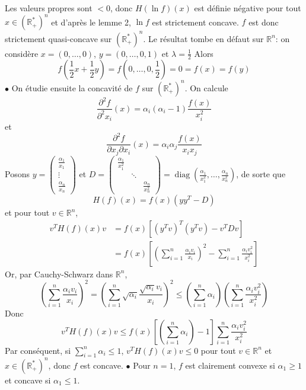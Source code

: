 \documentclass{report}
\DeclareMathOperator{\diag}{diag}
\begin{document}
Les valeurs propres sont $<0$, donc $H(\ln f)(x)$ est définie négative pour tout $x\in(\mathbb R_+^*)^n $ et d'après le lemme 2, $\ln f$ est strictement concave. $f$ est donc strictement quasi-concave sur $(\mathbb R_+^*)^n$.\newline
Le résultat tombe en défaut sur $\mathbb R^n$: on considère $x=(0,\ldots,0)$, $y=(0,\ldots,0,1)$ et $\lambda=\frac{1}{2}$ Alors $$f(\frac{1}{2}x + \frac{1}{2}y) = f(0,\ldots, 0,\frac{1}{2})=0 = f(x) = f(y)$$
$\bullet$ On étudie ensuite la concavité de $f$ sur $(\mathbb R_+^*)^n$.\newline
On calcule $$\frac{\partial^2 f}{\partial^2 x_i}(x) = \alpha_i(\alpha_i-1)\frac{f(x)}{x_i^2}$$
et $$\frac{\partial^2 f}{\partial x_j \partial x_i}(x) = \alpha_i \alpha_j\frac{f(x)}{x_i x_j}$$
Posons $y=\begin{pmatrix}
\frac{\alpha_1}{x_1}\\
\vdots\\
\frac{\alpha_n}{x_n}
\end{pmatrix}$ et $D=\begin{pmatrix}
\frac{\alpha_1}{x_1^2}\\
& \ddots \\
&& \frac{\alpha_n}{x_n^2}
\end{pmatrix}=\diag(\frac{\alpha_1}{x_1^2},\ldots,\frac{\alpha_n}{x_n^2})$, de sorte que 
$$H(f)(x)=f(x)(yy^T-D)$$ et pour tout $v\in \mathbb R^n$,
$$\begin{aligned} v^TH(f)(x)v &= f(x)[(y^Tv)^T(y^Tv)-v^TDv] \\
&= f(x) \left[\left(\sum_{i=1}^n \frac{\alpha_i v_i}{x_i}\right)^2 - \sum_{i=1}^n \frac{\alpha_i v_i^2}{x_i^2} \right]
\end{aligned}$$
Or, par Cauchy-Schwarz dans $\mathbb R^n$, 
$$\left(\sum_{i=1}^n\frac{\alpha_i v_i}{x_i} \right)^2 = \left(\sum_{i=1}^n \sqrt{\alpha_i}\frac{\sqrt{\alpha_i} v_i}{x_i} \right)^2 \leq \left(\sum_{i=1}^n \alpha_i \right) \left(\sum_{i=1}^n\frac{\alpha_i v_i^2}{x_i^2} \right)$$
Donc $$ v^TH(f)(x)v \leq f(x)\left[ \left(\sum_{i=1}^n \alpha_i\right) -1 \right]\sum_{i=1}^n\frac{\alpha_i v_i^2}{x_i^2}$$
Par conséquent, si $\displaystyle \sum_{i=1}^n \alpha_i \leq 1$, $v^TH(f)(x)v \leq 0$ pour tout $v\in \mathbb R^n$ et $x\in(\mathbb R_+^*)^n$, donc $f$ est concave. \newline 
\newline
$\bullet$ Pour $n=1$, $f$ est clairement convexe si $\alpha_1\geq 1$ et concave si $\alpha_1\leq 1 $.
\newline 
\newline
\end{document}
